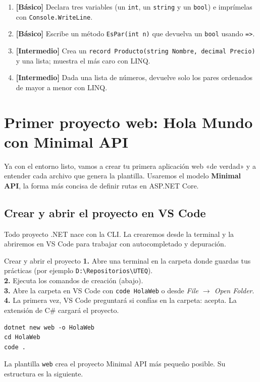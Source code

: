 \documentclass[11pt]{article}
\begin{document}
\begin{enumerate}[leftmargin=1.7em,itemsep=3pt,topsep=2pt]
\item \textbf{[Básico]} Declara tres variables (un \texttt{int}, un \texttt{string} y un \texttt{bool}) e imprímelas con \texttt{Console.WriteLine}.
\item \textbf{[Básico]} Escribe un método \texttt{EsPar(int n)} que devuelva un \texttt{bool} usando \texttt{=>}.
\item \textbf{[Intermedio]} Crea un \texttt{record Producto(string Nombre, decimal Precio)} y una lista; muestra el más caro con LINQ.
\item \textbf{[Intermedio]} Dada una lista de números, devuelve solo los pares ordenados de mayor a menor con LINQ.
\end{enumerate}

\section{Primer proyecto web: Hola Mundo con Minimal API}
Ya con el entorno listo, vamos a crear tu primera aplicación web «de verdad» y a entender cada archivo que genera la plantilla. Usaremos el modelo \textbf{Minimal API}, la forma más concisa de definir rutas en ASP.NET Core.

\subsection{Crear y abrir el proyecto en VS Code}
Todo proyecto .NET nace con la CLI. La crearemos desde la terminal y la abriremos en VS Code para trabajar con autocompletado y depuración.

\begin{cajavscode}{Crear y abrir el proyecto}
\textbf{1.} Abre una terminal en la carpeta donde guardas tus prácticas (por ejemplo \texttt{D:\textbackslash{}Repositorios\textbackslash{}UTEQ}).\\
\textbf{2.} Ejecuta los comandos de creación (abajo).\\
\textbf{3.} Abre la carpeta en VS Code con \texttt{code HolaWeb} o desde \emph{File $\rightarrow$ Open Folder}.\\
\textbf{4.} La primera vez, VS Code preguntará si confías en la carpeta: acepta. La extensión de C\# cargará el proyecto.
\end{cajavscode}

\begin{cajacodigo}
\begin{lstlisting}[style=shell]
dotnet new web -o HolaWeb
cd HolaWeb
code .
\end{lstlisting}
\end{cajacodigo}
\vspace{2pt}
La plantilla \texttt{web} crea el proyecto Minimal API más pequeño posible. Su estructura es la siguiente.
\end{document}
